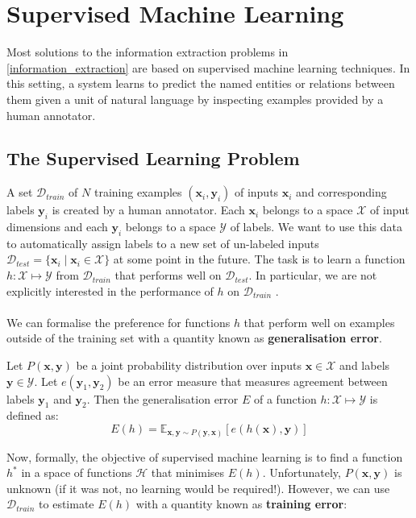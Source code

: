 \section{Supervised Machine Learning}
\label{supervised_machine_learning}

Most solutions to the information extraction problems in \ref{information_extraction} are based on supervised machine learning techniques. In this setting, a system learns to predict the named entities or relations between them given a unit of natural language by inspecting examples provided by a human annotator.

\subsection{The Supervised Learning Problem}
\label{the_supervised_learning_problem}
A set $\mathcal{D}_{train}$ of $N$ training examples $(\mathbf{x}_i, \mathbf{y}_i)$ of inputs $\mathbf{x}_i$ and corresponding labels $\mathbf{y}_i$ is created by a human annotator. Each $\mathbf{x}_i$ belongs to a space $\mathcal{X}$ of input dimensions and each $\mathbf{y}_i$ belongs to a space $\mathcal{Y}$ of labels. We want to use this data to automatically assign labels to a new set of un-labeled inputs $\mathcal{D}_{test} = \{ \mathbf{x}_i \mid \mathbf{x}_i \in \mathcal{X}\}$ at some point in the future. The task is to learn a function $h: \mathcal{X} \mapsto \mathcal{Y}$ from $\mathcal{D}_{train}$ that performs well on $\mathcal{D}_{test}$. In particular, we are not explicitly interested in the performance of $h$ on $\mathcal{D}_{train}$ \citep{yaser12}.
\\\\
We can formalise the preference for functions $h$ that perform well on examples outside of the training set with a quantity known as \textbf{generalisation error}.

\begin{definition}
	Let $P(\mathbf{x}, \mathbf{y})$ be a joint probability distribution over inputs $\mathbf{x} \in \mathcal{X}$ and labels $\mathbf{y} \in \mathcal{Y}$. Let $e(\mathbf{y}_1, \mathbf{y}_2)$ be an error measure that measures agreement between labels $\mathbf{y}_1$ and $\mathbf{y}_2$. Then the generalisation error $E$ of a function $h: \mathcal{X} \mapsto \mathcal{Y}$ is defined as:
	$$
		E(h) = \mathbb{E}_{\mathbf{x},\mathbf{y}\sim P(\mathbf{y}, \mathbf{x})}[e(h(\mathbf{x}), \mathbf{y})]
	$$
\end{definition}
Now, formally, the objective of supervised machine learning is to find a function $h^*$ in a space of functions $\mathcal{H}$ that minimises $E(h)$. Unfortunately, $P(\mathbf{x}, \mathbf{y})$ is unknown (if it was not, no learning would be required!). However, we can use $\mathcal{D}_{train}$ to estimate $E(h)$ with a quantity known as \textbf{training error}:

